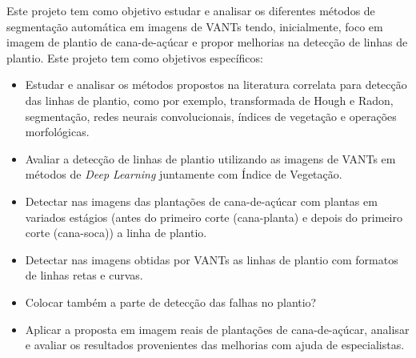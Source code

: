\documentclass[12pt, a4paper, english, brazil]{article}
\newcommand{\textRed}[1]{{{\color{red} #1}}}
\begin{document}
Este projeto tem como objetivo estudar e analisar os diferentes métodos de segmentação automática em imagens de VANTs tendo, inicialmente, foco em imagem de plantio de cana-de-açúcar e propor melhorias na detecção de linhas de plantio. 
Este projeto tem como objetivos específicos:
\begin{itemize}
    \item Estudar e analisar os métodos propostos na literatura correlata para detecção das linhas de plantio, como por exemplo, transformada de Hough e Radon, segmentação, redes neurais convolucionais, índices de vegetação e operações morfológicas.

    \item Avaliar a detecção de linhas de plantio utilizando as imagens de VANTs em métodos de \textit{Deep Learning} juntamente com Índice de Vegetação.

    \item Detectar nas imagens das plantações de cana-de-açúcar com plantas em variados estágios (antes do primeiro corte (cana-planta) e depois do primeiro corte (cana-soca)) a linha de plantio.

    \item Detectar nas imagens obtidas por VANTs
    as linhas de plantio com formatos de linhas retas e curvas.

    \item \textRed{Colocar também a parte de detecção das falhas no plantio?}

    \item Aplicar a proposta em imagem reais de plantações de cana-de-açúcar, analisar e avaliar os resultados provenientes das melhorias com ajuda de especialistas.
\end{itemize}


\end{document}
